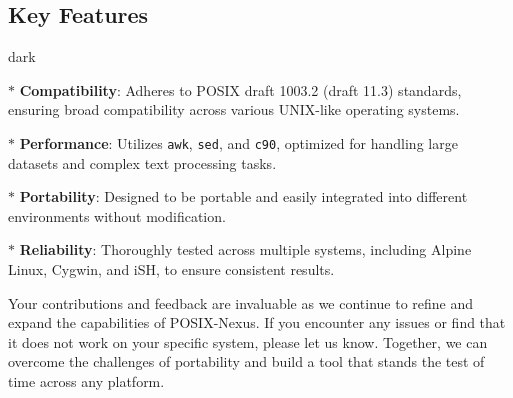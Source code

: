 \subsection{Key Features}
\bigskip
\begin{baseBoxOne}{}{dark}
    \begin{posnexItemize}
        \item[$\ast$] \textbf{Compatibility}: Adheres to POSIX draft 1003.2 (draft 11.3) standards, ensuring broad compatibility across various UNIX-like operating systems.
        \item[$\ast$] \textbf{Performance}: Utilizes \texttt{awk}, \texttt{sed}, and \texttt{c90}, optimized for handling large datasets and complex text processing tasks.
        \item[$\ast$] \textbf{Portability}: Designed to be portable and easily integrated into different environments without modification.
        \item[$\ast$] \textbf{Reliability}: Thoroughly tested across multiple systems, including Alpine Linux, Cygwin, and iSH, to ensure consistent results.
    \end{posnexItemize}
\end{baseBoxOne}
\bigskip
Your contributions and feedback are invaluable as we continue to refine and expand the capabilities of POSIX-Nexus. If you encounter any issues or find that it does not work on your specific system, please let us know. Together, we can overcome the challenges of portability and build a tool that stands the test of time across any platform.
